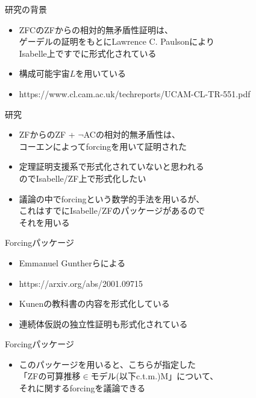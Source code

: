 \documentclass[17pt,aspectratio=169,xcolor=dvipsnames,table,dvipdfmx]{beamer}
\theoremstyle{definition}
\begin{document}
\begin{frame} {研究の背景}
    \begin{itemize}
        \item ZFCのZFからの相対的無矛盾性証明は、\\
              ゲーデルの証明をもとにLawrence C. Paulsonにより\\
              Isabelle上ですでに形式化されている
        \item 構成可能宇宙$L$を用いている
        \item https://www.cl.cam.ac.uk/techreports/UCAM-CL-TR-551.pdf
    \end{itemize}
\end{frame}

\begin{frame} {研究}
    \begin{itemize}
        \item ZFからのZF + $\neg$ACの相対的無矛盾性は、\\コーエンによってforcingを用いて証明された
        \item 定理証明支援系で形式化されていないと思われる\\のでIsabelle/ZF上で形式化したい
        \item 議論の中でforcingという数学的手法を用いるが、\\これはすでにIsabelle/ZFのパッケージがあるので\\それを用いる
    \end{itemize}
\end{frame}

\begin{frame} {Forcingパッケージ}
    \begin{itemize}
        \item Emmanuel Guntherらによる
        \item https://arxiv.org/abs/2001.09715
        \item Kunenの教科書の内容を形式化している
        \item 連続体仮説の独立性証明も形式化されている
    \end{itemize}
\end{frame}

\begin{frame} {Forcingパッケージ}
    \begin{itemize}
        \item このパッケージを用いると、こちらが指定した\\
              「ZFの可算推移$\in$モデル{\small(以下c.t.m.)}M」について、\\
              それに関するforcingを議論できる
    \end{itemize}
\end{frame}
\end{document}
